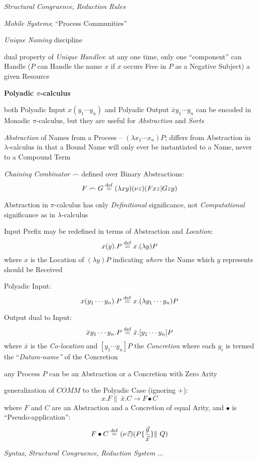 \emph{Structural Congruence}, \emph{Reduction Rules}

\emph{Mobile Systems}; ``Process Communities''

\emph{Unique Naming} discipline

dual property of \emph{Unique Handles}: at any one time, only one ``component''
can Handle ($P$ can Handle the name $x$ if $x$ occurs Free in $P$ as a Negative
Subject) a given Resource


\textbf{Polyadic $\pi$-calculus}

both Polyadic Input $x(y_1\cdots{y_n})$ and Polyadic Output
$\bar{x}y_1\cdots{y_n}$ can be encoded in Monadic $\pi$-calculus, but they are
useful for \emph{Abstraction} and \emph{Sorts}

\emph{Abstraction} of Names from a Process -- $(\lambda{x_1\cdots{x_n}})P$;
differs from Abstraction in $\lambda$-calculus in that a Bound Name will only
ever be instantiated to a Name, never to a Compound Term

\emph{Chaining Combinator} $\frown$ defined over Binary Abstractions:
\[
  F \frown G \stackrel{\mathrm{def}}= (\lambda{xy})(\nu{z})(Fxz | Gzy)
\]

Abstraction in $\pi$-calculus has only \emph{Definitional} significance, not
\emph{Computational} significance as in $\lambda$-calculus

Input Prefix may be redefined in terms of Abstraction and \emph{Location}:
\[
  x(y).P \stackrel{\mathrm{def}}= x.(\lambda{y}) P
\]
where $x$ is the Location of $(\lambda{y})P$ indicating \emph{where} the Name
which $y$ represents should be Received

Polyadic Input:
\[
  x(y_1\cdots{y_n}).P \stackrel{\mathrm{def}}= x.(\lambda{y_1\cdots{y_n}}) P
\]

Output dual to Input:
\[
  \bar{x}y_1\cdots{y_n}.P \stackrel{\mathrm{def}}= \bar{x}.[y_1\cdots{y_n}]P
\]
where $\bar{x}$ is the \emph{Co-location} and $[y_1\cdots{y_n}]P$ the
\emph{Concretion} where each $y_i$ is termed the ``\emph{Datum-name''} of the
Concretion

any Process $P$ can be an Abstraction or a Concretion with Zero Arity

generalization of $COMM$ to the Polyadic Case (ignoring $+$):
\[
  x.F \|\ \bar{x}.C \rightarrow F \bullet C
\]
where $F$ and $C$ are an Abstraction and a Concretion of equal Arity, and
$\bullet$ is ``Pseudo-application'':
\[
  F \bullet C \stackrel{\mathrm{def}}= (\nu\vec{z})(P\{\frac{\vec{y}}{\vec{x}}\} \|\ Q)
\]

\emph{Syntax}, \emph{Structural Congruence}, \emph{Reduction System} ...

